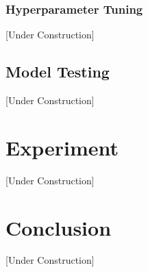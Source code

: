 \documentclass[paper=a4, fontsize=11pt]{scrartcl}
\numberwithin{equation}{section}		%
\numberwithin{table}{section}				%
\begin{document}
\subsubsection{Hyperparameter Tuning}

[Under Construction]

\subsection{Model Testing}

[Under Construction]

\section{Experiment}\label{sec: experiment}

[Under Construction]

\section{Conclusion}\label{sec: conlusion}

[Under Construction]
 
\clearpage
 




\end{document}
